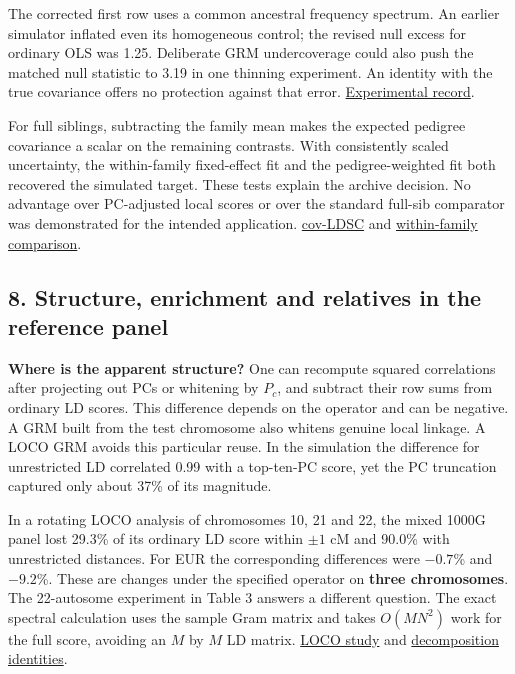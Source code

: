 \documentclass[11pt,a4paper]{article}
\let\reportsection\subsection
\newif\ifinsupplement
\renewcommand{\subsection}[1]{\clearpage
  \ifstrequal{#1}{Supplementary Methods}{\insupplementtrue
    \fancyhead[R]{\small\sffamily Supplementary methods}}{}
  \reportsection{#1}}
\begin{document}
The corrected first row uses a common ancestral frequency spectrum. An earlier simulator inflated even its homogeneous control; the revised null excess for ordinary OLS was 1.25. Deliberate GRM undercoverage could also push the matched null statistic to 3.19 in one thinning experiment. An identity with the true covariance offers no protection against that error. \href{../experiments/RESULTS.md}{Experimental record}.

For full siblings, subtracting the family mean makes the expected pedigree covariance a scalar on the remaining contrasts. With consistently scaled uncertainty, the within-family fixed-effect fit and the pedigree-weighted fit both recovered the simulated target. These tests explain the archive decision. No advantage over PC-adjusted local scores or over the standard full-sib comparator was demonstrated for the intended application. \href{https://pubmed.ncbi.nlm.nih.gov/33987664/}{cov-LDSC} and \href{../experiments/within_family_killtest.py}{within-family comparison}.

\subsection{8. Structure, enrichment and relatives in the reference panel}\label{8-structure-enrichment-and-relatives-in-the-reference-panel}

\textbf{Where is the apparent structure?} One can recompute squared correlations after projecting out PCs or whitening by \(P_c\), and subtract their row sums from ordinary LD scores. This difference depends on the operator and can be negative. A GRM built from the test chromosome also whitens genuine local linkage. A LOCO GRM avoids this particular reuse. In the simulation the difference for unrestricted LD correlated 0.99 with a top-ten-PC score, yet the PC truncation captured only about 37\% of its magnitude.

In a rotating LOCO analysis of chromosomes 10, 21 and 22, the mixed 1000G panel lost 29.3\% of its ordinary LD score within \(\pm1\) cM and 90.0\% with unrestricted distances. For EUR the corresponding differences were \(-0.7\)\% and \(-9.2\)\%. These are changes under the specified operator on \textbf{three chromosomes}. The 22-autosome experiment in Table 3 answers a different question. The exact spectral calculation uses the sample Gram matrix and takes \(O(MN^2)\) work for the full score, avoiding an \(M\) by \(M\) LD matrix. \href{../experiments/realdata_genome_loco.py}{LOCO study} and \href{../docs/METHOD.md}{decomposition identities}.
\end{document}
